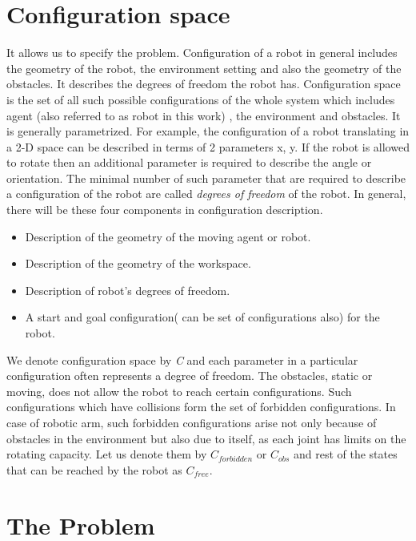 \documentclass[MTech]{iitmdiss}
\begin{document}
\section{Configuration space}
  
It allows us to specify the problem. Configuration of a robot in general includes the geometry of the robot, the environment setting and also the geometry of the obstacles. It describes the degrees of freedom the robot has. Configuration space is the set of all such possible configurations of the whole system which includes agent (also referred to as  robot in this work) , the environment and obstacles. It is generally parametrized. For example, the configuration of a robot translating in a 2-D space can be described in terms of 2 parameters x, y. If the robot is allowed to rotate then an additional parameter is required to describe the angle or orientation. The minimal number of such parameter that are required to describe a configuration of the robot are called \textit{degrees of freedom} of the robot. 
In general, there will be these four components in configuration description.

\begin{itemize}
\item Description of the geometry of the moving agent or robot.
\item Description of the geometry of the workspace.
\item Description of robot's degrees of freedom.
\item A start and goal configuration( can be set of configurations also)  for the robot.
\end{itemize}

We denote configuration space by \emph{C} and each parameter in a particular configuration often represents a degree of freedom.
The obstacles, static or moving, does not allow the robot to reach certain configurations. Such configurations which have collisions form the set of forbidden configurations. In case of robotic arm, such forbidden configurations arise not only because of obstacles in the environment but also due to itself, as each joint has limits on the rotating capacity. Let us denote them by \emph{$C_{forbidden}$} or \emph{$C_{obs}$} and rest of the states that can be reached by the robot as \emph{$C_{free}$}. 

\section{The Problem}
\end{document}
